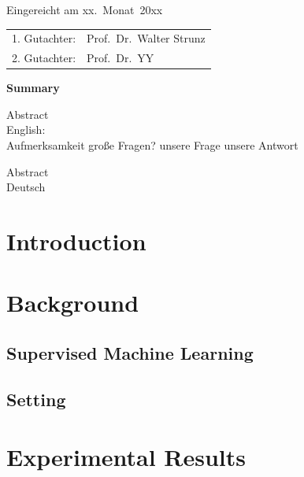 \thispagestyle{empty}\vspace*{48em}

Eingereicht am xx.~Monat~20xx\vspace{1.5em}
\par{\large\begin{tabular}{ll}
 1. Gutachter: & Prof.~Dr.~Walter Strunz \\
 2. Gutachter: & Prof.~Dr.~YY \\
\end{tabular}}


\newpage
\begin{center}\large\bfseries Summary\end{center}


Abstract \\ 
English: \\
Aufmerksamkeit
große Fragen?
unsere Frage
unsere Antwort

\vspace{20em}
Abstract \\ 
Deutsch \\
 
 

\tableofcontents




\chapter{Introduction}


\chapter{Background}


\section{Supervised Machine Learning}

\section{Setting}


\cite{bernardo2020unravelling}

\chapter{Experimental Results}

